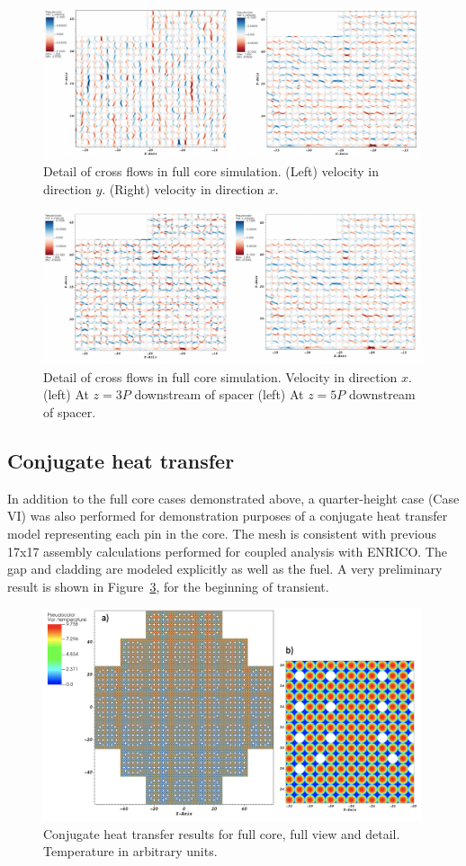 \begin{figure}[!ht]
\centering
\includegraphics[width=0.99\textwidth]{./figures/fullcore_msm_v02.png}
\caption{Detail of cross flows in full core simulation. (Left) velocity in direction $y$. (Right) velocity in direction $x$. }
\label{fig:msm2}
\end{figure}

\begin{figure}[!ht]
\centering
\includegraphics[width=0.99\textwidth]{./figures/fullcore_msm_v03.png}
\caption{Detail of cross flows in full core simulation. Velocity in direction $x$. (left) At $z=3P$ downstream of spacer  (left) At $z=5P$ downstream of spacer. }
\label{fig:msm3}
\end{figure}

\subsection{Conjugate heat transfer}
\label{sec:results4}

In addition to the full core cases demonstrated above, a quarter-height case (Case VI) was also performed for demonstration purposes of a conjugate heat transfer model representing each pin in the core. The mesh is consistent with previous 17x17 assembly calculations performed for coupled analysis with ENRICO. The gap and cladding are modeled explicitly as well as the fuel. A very preliminary result is shown in Figure~\ref{fig:cht}, for the beginning of transient.

\begin{figure}[!ht]
\centering
\includegraphics[width=0.99\textwidth]{./figures/quarter_cht.png}
\caption{Conjugate heat transfer results for full core, full view and detail. Temperature in arbitrary units.}
\label{fig:cht}
\end{figure}

